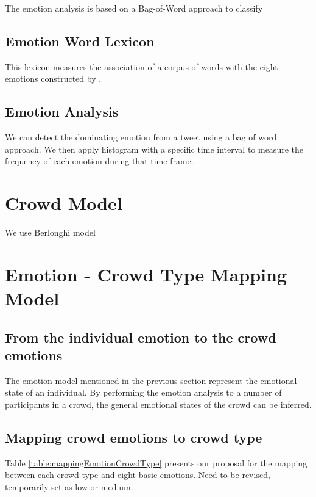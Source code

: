 The emotion analysis is based on a Bag-of-Word approach to classify 

\subsection{Emotion Word Lexicon}
This lexicon measures the association of a corpus of words with the eight emotions constructed by \citet{mohammad2014using}.

\subsection{Emotion Analysis}
We can detect the dominating emotion from a tweet using a bag of word approach. We then apply histogram with a specific time interval to measure the frequency of each emotion during that time frame.

\section{Crowd Model}

We use Berlonghi model

\section{Emotion - Crowd Type Mapping Model}

\subsection{From the individual emotion to the crowd emotions}
The emotion model mentioned in the previous section represent the emotional state of an individual. By performing the emotion analysis to a number of participants in a crowd, the general emotional states of the crowd can be inferred.

\subsection{Mapping crowd emotions to crowd type}
Table \ref{table:mappingEmotionCrowdType} presents our proposal for the mapping between each crowd type and eight basic emotions. Need to be revised, temporarily set as low or medium.

